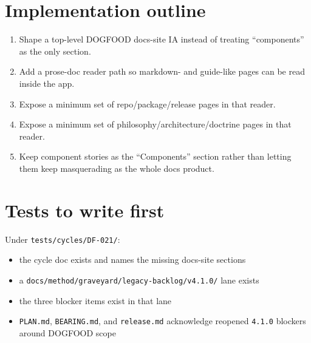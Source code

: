 \section{Implementation outline}\label{record-082-implementation-outline}

\begin{enumerate}
\def\labelenumi{\arabic{enumi}.}
\tightlist
\item
  Shape a top-level DOGFOOD docs-site IA instead of treating ``components'' as the only section.
\item
  Add a prose-doc reader path so markdown- and guide-like pages can be read inside the app.
\item
  Expose a minimum set of repo/package/release pages in that reader.
\item
  Expose a minimum set of philosophy/architecture/doctrine pages in that reader.
\item
  Keep component stories as the ``Components'' section rather than letting them keep masquerading as the whole docs product.
\end{enumerate}

\section{Tests to write first}\label{record-082-tests-to-write-first}

Under \texttt{t\allowbreak{}e\allowbreak{}s\allowbreak{}t\allowbreak{}s\allowbreak{}/\allowbreak{}c\allowbreak{}y\allowbreak{}c\allowbreak{}l\allowbreak{}e\allowbreak{}s\allowbreak{}/\allowbreak{}D\allowbreak{}F\allowbreak{}-\allowbreak{}0\allowbreak{}2\allowbreak{}1\allowbreak{}/}:

\begin{itemize}
\tightlist
\item
  the cycle doc exists and names the missing docs-site sections
\item
  a \texttt{d\allowbreak{}o\allowbreak{}c\allowbreak{}s\allowbreak{}/\allowbreak{}m\allowbreak{}e\allowbreak{}t\allowbreak{}h\allowbreak{}o\allowbreak{}d\allowbreak{}/\allowbreak{}g\allowbreak{}r\allowbreak{}a\allowbreak{}v\allowbreak{}e\allowbreak{}y\allowbreak{}a\allowbreak{}r\allowbreak{}d\allowbreak{}/\allowbreak{}l\allowbreak{}e\allowbreak{}g\allowbreak{}a\allowbreak{}c\allowbreak{}y\allowbreak{}-\allowbreak{}b\allowbreak{}a\allowbreak{}c\allowbreak{}k\allowbreak{}l\allowbreak{}o\allowbreak{}g\allowbreak{}/\allowbreak{}v\allowbreak{}4\allowbreak{}.\allowbreak{}1\allowbreak{}.\allowbreak{}0\allowbreak{}/} lane exists
\item
  the three blocker items exist in that lane
\item
  \texttt{P\allowbreak{}L\allowbreak{}A\allowbreak{}N\allowbreak{}.\allowbreak{}m\allowbreak{}d}, \texttt{B\allowbreak{}E\allowbreak{}A\allowbreak{}R\allowbreak{}I\allowbreak{}N\allowbreak{}G\allowbreak{}.\allowbreak{}m\allowbreak{}d}, and \texttt{r\allowbreak{}e\allowbreak{}l\allowbreak{}e\allowbreak{}a\allowbreak{}s\allowbreak{}e\allowbreak{}.\allowbreak{}m\allowbreak{}d} acknowledge reopened \texttt{4\allowbreak{}.\allowbreak{}1\allowbreak{}.\allowbreak{}0} blockers around DOGFOOD scope
\end{itemize}

